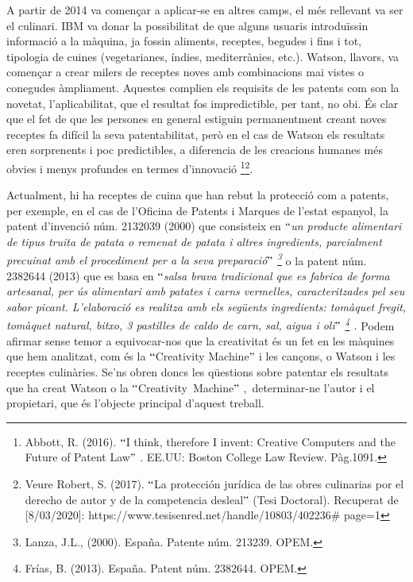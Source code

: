 \documentclass[12pt]{article}
\begin{document}
\begin{enumerate}
\vspace{\baselineskip}
A partir de 2014 va començar a aplicar-se en altres camps, el més rellevant va ser el culinari. IBM va donar la possibilitat de que alguns usuaris introduïssin informació a la màquina, ja fossin aliments, receptes, begudes i fins i tot, tipologia de cuines (vegetarianes, índies, mediterrànies, etc.). Watson, llavors, va començar a crear milers de receptes noves amb combinacions mai vistes o conegudes àmpliament. Aquestes complien els requisits de les patents com son la novetat, l’aplicabilitat, que el resultat fos impredictible, per tant, no obi. És clar que el fet de que les persones en general estiguin permanentment creant noves receptes fa difícil la seva patentabilitat, però en el cas de Watson els resultats eren sorprenents i poc predictibles, a diferencia de les creacions humanes més obvies i menys profundes en termes d’innovació \footnote{ Abbott, R. (2016). $``$I think, therefore I invent: Creative Computers and the Future of Patent Law$"$ . EE.UU: Boston College Law Review. Pàg.1091. }\footnote{ Veure Robert, S. (2017). $``$La protección jurídica de las obres culinarias por el derecho de autor y de la competencia desleal$"$  (Tesi Doctoral). Recuperat de [8/03/2020]: https://www.tesisenred.net/handle/10803/402236$\#$ page=1 }. \par


\vspace{\baselineskip}
Actualment, hi ha receptes de cuina que han rebut la protecció com a patents, per exemple, en el cas de l’Oficina de Patents i Marques de l’estat espanyol, la patent d’invenció núm. 2132039 (2000) que consisteix en \textit{$``$un producte alimentari de tipus truita de patata o remenat de patata i altres ingredients, parcialment precuinat amb el procediment per a la seva preparació$"$ \footnote{ Lanza, J.L., (2000). España. Patente núm. 213239. OPEM. } }o la patent núm. 2382644 (2013) que es basa en $``$\textit{salsa brava tradicional que es fabrica de forma artesanal, per ús alimentari amb patates i carns vermelles, caracteritzades pel seu sabor picant. L’elaboració es realitza amb els següents ingredients: tomàquet fregit, tomàquet natural, bitxo, 3 pastilles de caldo de carn, sal, aigua i oli$"$ \footnote{ Frías, B. (2013). España. Patent núm. 2382644. OPEM.  } . }Podem afirmar sense temor a equivocar-nos que la creativitat és un fet en les màquines que hem analitzat, com és la $``$Creativity Machine$"$  i les cançons, o Watson i les receptes culinàries.\textit{ }Se’ns obren doncs les qüestions sobre patentar els resultats que ha creat Watson o la $``$Creativity\ Machine$"$ ,\  determinar-ne l’autor i  el propietari, que és l’objecte principal d’aquest treball. \par



\end{enumerate}
\end{document}
